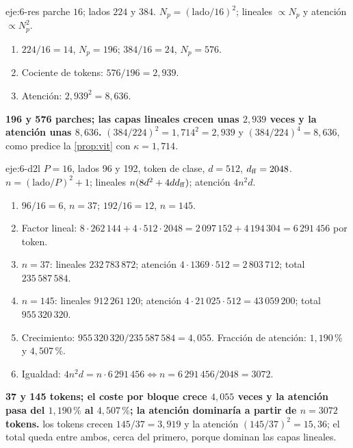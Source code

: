 \begin{solucion}{eje:6-res}
\datos parche $16$; lados $224$ y $384$.
\planteamiento $N_p=(\text{lado}/16)^{2}$; lineales $\propto N_p$ y atención $\propto N_p^{2}$.
\pasos
\begin{enumerate}[label=\arabic*.]
  \item $224/16=14$, $N_p=196$; $384/16=24$, $N_p=576$.
  \item Cociente de tokens: $576/196=2{,}939$.
  \item Atención: $2{,}939^{2}=8{,}636$.
\end{enumerate}
\resultado \textbf{196 y 576 parches; las capas lineales crecen unas $2{,}939$ veces y la atención unas $8{,}636$.}
\comprobacion $(384/224)^{2}=1{,}714^{2}=2{,}939$ y $(384/224)^{4}=8{,}636$, como predice la \cref{prop:vit} con $\kappa=1{,}714$.
\end{solucion}

\begin{solucion}{eje:6-d2l}
\datos $P=16$, lados 96 y 192, token de clase, $d=512$, $d_{\mathrm{ff}}=2048$.
\planteamiento $n=(\text{lado}/P)^{2}+1$; lineales $n(8d^{2}+4dd_{\mathrm{ff}})$; atención $4n^{2}d$.
\pasos
\begin{enumerate}[label=\arabic*.]
  \item $96/16=6$, $n=37$; $192/16=12$, $n=145$.
  \item Factor lineal: $8\cdot 262\,144+4\cdot 512\cdot 2048=2\,097\,152+4\,194\,304=6\,291\,456$ por token.
  \item $n=37$: lineales $232\,783\,872$; atención $4\cdot 1369\cdot 512=2\,803\,712$; total $235\,587\,584$.
  \item $n=145$: lineales $912\,261\,120$; atención $4\cdot 21\,025\cdot 512=43\,059\,200$; total $955\,320\,320$.
  \item Crecimiento: $955\,320\,320/235\,587\,584=4{,}055$. Fracción de atención: $1{,}190\,\%$ y $4{,}507\,\%$.
  \item Igualdad: $4n^{2}d=n\cdot 6\,291\,456\iff n=6\,291\,456/2048=3072$.
\end{enumerate}
\resultado \textbf{37 y 145 tokens; el coste por bloque crece $4{,}055$ veces y la atención pasa del $1{,}190\,\%$ al $4{,}507\,\%$; la atención dominaría a partir de $n=3072$ tokens.}
\comprobacion los tokens crecen $145/37=3{,}919$ y la atención $(145/37)^{2}=15{,}36$; el total queda entre ambos, cerca del primero, porque dominan las capas lineales.
\end{solucion}

